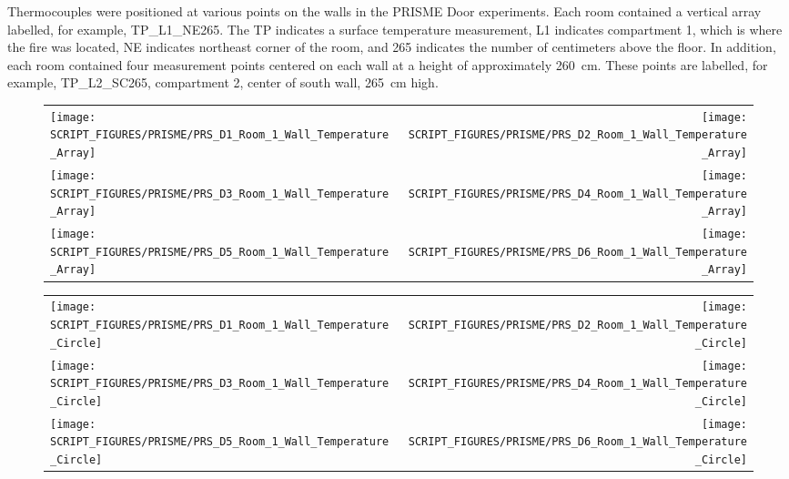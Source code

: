 \clearpage

Thermocouples were positioned at various points on the walls in the PRISME Door experiments. Each room contained a vertical array labelled, for example, TP\_L1\_NE265. The TP indicates a surface temperature measurement, L1 indicates compartment 1, which is where the fire was located, NE indicates northeast corner of the room, and 265 indicates the number of centimeters above the floor. In addition, each room contained four measurement points centered on each wall at a height of approximately 260~cm. These points are labelled, for example, TP\_L2\_SC265, compartment 2, center of south wall, 265~cm high.

\begin{figure}[!ht]
\begin{tabular*}{\textwidth}{l@{\extracolsep{\fill}}r}
\texttt{[image: SCRIPT\_FIGURES/PRISME/PRS\_D1\_Room\_1\_Wall\_Temperature\_Array]} &
\texttt{[image: SCRIPT\_FIGURES/PRISME/PRS\_D2\_Room\_1\_Wall\_Temperature\_Array]} \\
\texttt{[image: SCRIPT\_FIGURES/PRISME/PRS\_D3\_Room\_1\_Wall\_Temperature\_Array]} &
\texttt{[image: SCRIPT\_FIGURES/PRISME/PRS\_D4\_Room\_1\_Wall\_Temperature\_Array]} \\
\texttt{[image: SCRIPT\_FIGURES/PRISME/PRS\_D5\_Room\_1\_Wall\_Temperature\_Array]} &
\texttt{[image: SCRIPT\_FIGURES/PRISME/PRS\_D6\_Room\_1\_Wall\_Temperature\_Array]}
\end{tabular*}
\label{PRISME_Wall_Array_Room_1}
\end{figure}

\begin{figure}[p]
\begin{tabular*}{\textwidth}{l@{\extracolsep{\fill}}r}
\texttt{[image: SCRIPT\_FIGURES/PRISME/PRS\_D1\_Room\_1\_Wall\_Temperature\_Circle]} &
\texttt{[image: SCRIPT\_FIGURES/PRISME/PRS\_D2\_Room\_1\_Wall\_Temperature\_Circle]} \\
\texttt{[image: SCRIPT\_FIGURES/PRISME/PRS\_D3\_Room\_1\_Wall\_Temperature\_Circle]} &
\texttt{[image: SCRIPT\_FIGURES/PRISME/PRS\_D4\_Room\_1\_Wall\_Temperature\_Circle]} \\
\texttt{[image: SCRIPT\_FIGURES/PRISME/PRS\_D5\_Room\_1\_Wall\_Temperature\_Circle]} &
\texttt{[image: SCRIPT\_FIGURES/PRISME/PRS\_D6\_Room\_1\_Wall\_Temperature\_Circle]}
\end{tabular*}
\label{PRISME_Wall_Circle_Room_1}
\end{figure}

